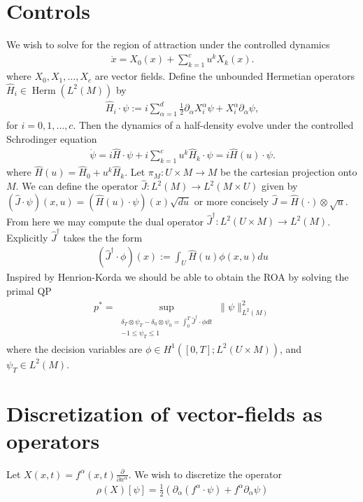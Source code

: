 \documentclass[12pt]{amsart}
\newcommand{\pder}[2]{\ensuremath{\frac{ \partial #1}{\partial #2}}}
\DeclareMathOperator{\Herm}{Herm}
\begin{document}
\section{Controls}
We wish to solve for the region of attraction under the controlled dynamics
\begin{align*}
	\dot{x} = X_0(x) + \sum_{k=1}^{c} u^k X_k(x).
\end{align*}
where $X_0,X_1,\dots,X_c$ are vector fields.
Define the unbounded Hermetian operators $\hat{H}_i \in \Herm(L^2(M) )$ by
\begin{align*}
	\hat{H}_i \cdot \psi := i \sum_{\alpha=1}^d   \frac{1}{2} \partial_\alpha X_i^\alpha  \psi + X_i^\alpha \partial_\alpha \psi,
\end{align*}
for $i=0,1,\dots,c$.
Then the dynamics of a half-density evolve under the controlled Schrodinger equation
\begin{align*}
	\dot{\psi} = i \hat{H} \cdot \psi + i \sum_{k=1}^c u^k \hat{H}_k \cdot \psi = i \hat{H}(u) \cdot \psi.
\end{align*}
where $\hat{H}(u) = \hat{H}_0 + u^k \hat{H}_k$.
Let $\pi_M : U \times M \to M$ be the cartesian projection onto $M$.
We can define the operator $\hat{J} : L^2(M) \to L^2(M \times U)$ given by $(\hat{J} \cdot \psi )(x,u)= (\hat{H}(u) \cdot \psi)(x) \sqrt{du}$
or more concisely $\hat{J} = \hat{H}(\cdot) \otimes \sqrt{u}$.
From here we may compute the dual operator $\hat{J}^\dagger : L^2( U \times M) \to L^2(M)$.
Explicitly $\hat{J}^\dagger$ takes the the form
\begin{align*}
	(\hat{J}^\dagger \cdot \phi )(x) :=  \int_U \hat{H}(u) \phi(x,u) du
\end{align*}
Inspired by Henrion-Korda we should be able to obtain the ROA by solving the primal QP
\begin{align*}
	p^* = \sup_{
		\substack{ \delta_T \otimes \psi_T - \delta_0 \otimes \psi_0 = \int_{0}^T \hat{J}^\dagger \cdot \phi dt \\ -1 \leq \psi_T \leq 1  }}
			 \| \psi \|_{L^2(M)}^2
\end{align*}
where the decision variables are $\phi \in H^1( [0,T] ; L^2(U \times M) )$, and $\psi_T  \in L^2(M)$.

\section{Discretization of vector-fields as operators}
\label{sec:discretization of vector-fields}
Let $X (x,t)= f^\alpha(x,t) \pder{}{x^\alpha}$.
We wish to discretize the operator
\begin{align*}
	\rho(X)[\psi] = \frac{1}{2} \left(  \partial_\alpha( f^\alpha \cdot \psi) + f^\alpha \partial_\alpha \psi \right)
\end{align*}
\end{document}
